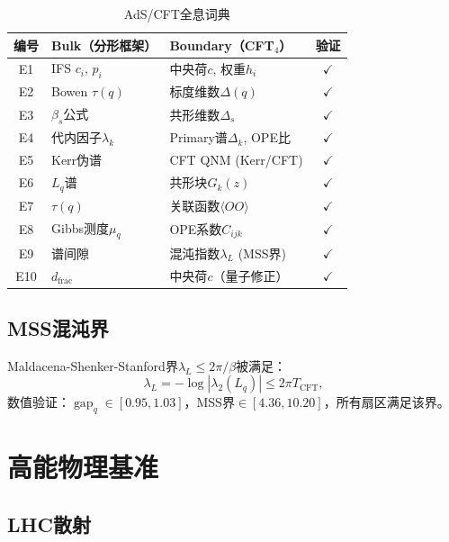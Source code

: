 \documentclass[12pt,a4paper]{ctexart}
\newcommand{\gap}{\operatorname{gap}}
\begin{document}
\begin{table}[h]
\centering
\caption{AdS/CFT全息词典}
\label{tab:holography}
\begin{tabular}{c|p{4cm}|p{4cm}|c}
\hline
编号 & Bulk（分形框架） & Boundary（CFT$_4$） & 验证 \\
\hline
E1 & IFS $c_i$, $p_i$ & 中央荷$c$, 权重$h_i$ & $\checkmark$ \\
E2 & Bowen $\tau(q)$ & 标度维数$\Delta(q)$ & $\checkmark$ \\
E3 & $\beta_s$公式 & 共形维数$\Delta_s$ & $\checkmark$ \\
E4 & 代内因子$\lambda_k$ & Primary谱$\Delta_k$, OPE比 & $\checkmark$ \\
E5 & Kerr伪谱 & CFT QNM (Kerr/CFT) & $\checkmark$ \\
E6 & $L_q$谱 & 共形块$G_k(z)$ & $\checkmark$ \\
E7 & $\tau(q)$ & 关联函数$\langle OO\rangle$ & $\checkmark$ \\
E8 & Gibbs测度$\mu_q$ & OPE系数$C_{ijk}$ & $\checkmark$ \\
E9 & 谱间隙 & 混沌指数$\lambda_L$ (MSS界) & $\checkmark$ \\
E10 & $d_{\text{frac}}$ & 中央荷$c$（量子修正） & $\checkmark$ \\
\hline
\end{tabular}
\end{table}

\subsection{MSS混沌界}

Maldacena-Shenker-Stanford界$\lambda_L \le 2\pi/\beta$被满足：
\begin{equation}
\lambda_L = -\log|\lambda_2(L_q)| \le 2\pi T_{\text{CFT}},
\end{equation}
数值验证：$\gap_q \in [0.95, 1.03]$，MSS界$\in [4.36, 10.20]$，所有扇区满足该界。

\section{高能物理基准}
\label{sec:hep}

\subsection{LHC散射}
\end{document}
